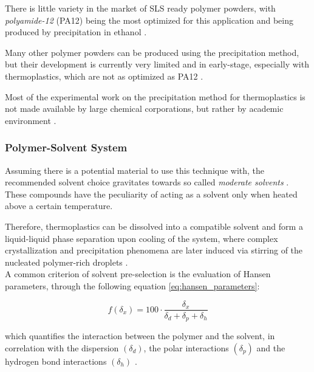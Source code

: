\documentclass{article}
\begin{document}
    There is little variety in the market of SLS ready polymer powders, with \textit{polyamide-12} (PA12) being the most optimized for this 
    application and being produced by precipitation in ethanol \autocite*{DechetMaximilianA2020OtDo}.
    
    Many other polymer powders can be produced using the precipitation method, but their development is currently very limited 
    and in early-stage, especially with thermoplastics, which are not as optimized as PA12 \autocites{Kovalcik_PHA_Review}.
    
    Most of the experimental work on the precipitation method for thermoplastics is not made available by large chemical corporations, 
    but rather by academic environment \autocites{Kovalcik_PHA_Review}. 

    \subsubsection{Polymer-Solvent System \label{polymer_solvent_system}}

    Assuming there is a potential material to use this technique with, the recommended solvent choice gravitates towards 
    so called \textit{moderate solvents} \autocite*{DechetMaximilianA2020OtDo}. \\
    
    These compounds have the peculiarity of acting as a solvent only when heated above a certain temperature. 

    Therefore, thermoplastics can be dissolved into a compatible solvent and form a liquid-liquid phase separation
    upon cooling of the system, where complex crystallization and precipitation phenomena are later induced via stirring of 
    the nucleated polymer-rich droplets \autocite*{DechetMaximilianA2020OtDo}.  \\ 

    A common criterion of solvent pre-selection is the evaluation of Hansen parameters, through the following equation \ref{eq:hansen_parameters}: 

    \begin{equation}
        \textit{f} (\delta_x) = 100 \cdot \frac{\delta_x}{\delta_d + \delta_p + \delta_h}
        \label{eq:hansen_parameters}
    \end{equation}

    which quantifies the interaction between the polymer and the solvent, in correlation with the dispersion $(\delta_d)$, 
    the polar interactions $(\delta_p)$ and the hydrogen bond interactions $(\delta_h)$ \autocite*{DechetMaximilianA2020OtDo}. 
\end{document}
